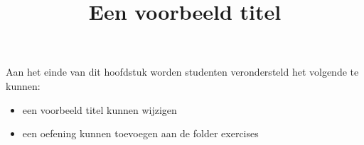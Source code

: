 \documentclass{ximera}
\title{Een voorbeeld titel}
\begin{document}
\begin{abstract}
\end{abstract}

\maketitle

\begin{sectionOutcomes}

Aan het einde van dit hoofdstuk worden studenten verondersteld het volgende te kunnen:

\begin{itemize}
\item een voorbeeld titel kunnen wijzigen
\item een oefening kunnen toevoegen aan de folder exercises 
\end{itemize}

\end{sectionOutcomes}
\end{document}
